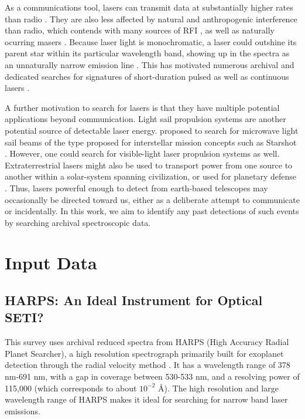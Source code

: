 \documentclass[twocolumn]{aastex701}
\begin{document}
As a communications tool, lasers can transmit data at substantially higher rates than radio \citep{Tellis_2017,Kingsley}. They are also less affected by natural and anthropogenic interference than radio, which contends with many sources of RFI \citep{RFIpaper}, as well as naturally ocurring masers \citep{mendez2024arecibowowiastrophysical}. Because laser light is monochromatic, a laser could outshine its parent star within its particular wavelength band, showing up in the spectra as an unnaturally narrow emission line \citep{TOWNES_SCHWARTZ_1961,STANTON201992}. This has motivated numerous archival and dedicated searches for signatures of short-duration pulsed as well as continuous lasers \citep{Tellis_2017,Lipman_2019,Howard_2004,Shelley_Wright,Zuckerman_2023,Reines_2002,Maire_2019,Marcy_2021}.

A further motivation to search for lasers is that they have multiple potential applications beyond communication. Light sail propulsion systems are another potential source of detectable laser energy. \cite{Guillochon_2015} proposed to search for microwave light sail beams of the type proposed for interstellar mission concepts such as Starshot \citep{STARSHOT}. However, one could search for visible-light laser propulsion systems as well. Extraterrestrial lasers might also be used to transport power from one source to another within a solar-system spanning civilization, or used for planetary defense \citep{Bible_Johansson_Hughes_Lubin_2013}. Thus, lasers powerful enough to detect from earth-based telescopes may occasionally be directed toward us, either as a deliberate attempt to communicate or incidentally. In this work, we aim to identify any past detections of such events by searching archival spectroscopic data.

\section{Input Data}
\subsection{HARPS: An Ideal Instrument for Optical SETI?}
This survey uses archival reduced spectra from HARPS (High Accuracy Radial Planet Searcher), a high resolution spectrograph primarily built for exoplanet detection through the radial velocity method \citep{HARPS_specs}. It has a wavelength range of 378 nm-691 nm, with a gap in coverage between 530-533 nm, and a resolving power of 115,000 \citep{HARPS_specs} (which corresponds to about $10^{-2}$ \AA). The high resolution and large wavelength range of HARPS makes it ideal for searching for narrow band laser emissions. 
\end{document}
